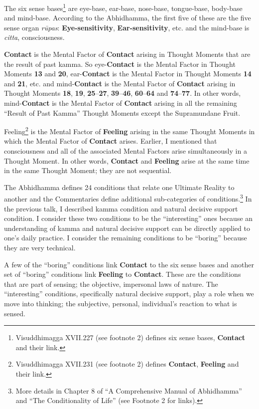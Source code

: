 The six sense bases\footnote{Visuddhimagga XVII.227 (see footnote 2) defines six sense bases, \textbf{Contact} and their link.} are eye-base, ear-base, nose-base, tongue-base, body-base and mind-base. According to the Abhidhamma, the first five of these are the five sense organ \textit{rūpas}: \textbf{Eye-sensitivity}, \textbf{Ear-sensitivity}, etc. and the mind-base is \textit{citta}, consciousness.

\textbf{Contact} is the Mental Factor of \textbf{Contact} arising in Thought Moments that are the result of past kamma. So eye-\textbf{Contact} is the Mental Factor in Thought Moments \textbf{13} and \textbf{20}, ear-\textbf{Contact} is the Mental Factor in Thought Moments \textbf{14} and \textbf{21}, etc. and mind-\textbf{Contact} is the Mental Factor of \textbf{Contact} arising in Thought Moments \textbf{18}, \textbf{19}, \textbf{25}--\textbf{27}, \textbf{39}--\textbf{46}, \textbf{60}--\textbf{64} and \textbf{74}--\textbf{77}. In other words, mind-\textbf{Contact} is the Mental Factor of \textbf{Contact} arising in all the remaining “Result of Past Kamma” Thought Moments except the Supramundane Fruit.

Feeling\footnote{Visuddhimagga XVII.231 (see footnote 2) defines \textbf{Contact}, \textbf{Feeling} and their link.} is the Mental Factor of \textbf{Feeling} arising in the same Thought Moments in which the Mental Factor of \textbf{Contact} arises. Earlier, I mentioned that consciousness and all of the associated Mental Factors arise simultaneously in a Thought Moment. In other words, \textbf{Contact} and \textbf{Feeling} arise at the same time in the same Thought Moment; they are not sequential.

The Abhidhamma defines 24 conditions that relate one Ultimate Reality to another and the Commentaries define additional sub-categories of conditions.\footnote{More details in Chapter 8 of “A Comprehensive Manual of Abhidhamma” and “The Conditionality of Life” (see Footnote 2 for links).} In the previous talk, I described kamma condition and natural decisive support condition. I consider these two conditions to be the “interesting” ones because an understanding of kamma and natural decisive support can be directly applied to one’s daily practice. I consider the remaining conditions to be “boring” because they are very technical.

A few of the “boring” conditions link \textbf{Contact} to the six sense bases and another set of “boring” conditions link \textbf{Feeling} to \textbf{Contact}. These are the conditions that are part of sensing; the objective, impersonal laws of nature. The “interesting” conditions, specifically natural decisive support, play a role when we move into thinking; the subjective, personal, individual’s reaction to what is sensed.

